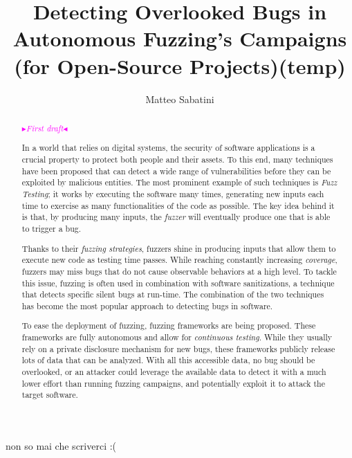 \documentclass[binding=0.6cm, oneside]{sapthesis}%
\title{Detecting Overlooked Bugs in Autonomous Fuzzing's Campaigns (for Open-Source Projects)(temp)}
\author{Matteo Sabatini}
\newcommand{\mytext}[2]{\textcolor{#1}{#2}}
\newcommand{\mynote}[2]{\xspace\fbox{\bfseries\sffamily\scriptsize{#1}}
	{\small$\blacktriangleright$\textsf{\scriptsize\emph{#2}}$\blacktriangleleft$}}
\newcommand{\matteo}[1]{\mytext{magenta}{\mynote{MM}{#1}}}
\begin{document}
\frontmatter
\maketitle

\begin{acknowledgments}
non so mai che scriverci :(
\end{acknowledgments}


\begin{abstract}

	\matteo{First draft}

	In a world that relies on digital systems, the security of software applications is a crucial property to protect both people and their assets. To this end, many techniques have been proposed that can detect a wide range of vulnerabilities before they can be exploited by malicious entities. The most prominent example of such techniques is \textit{Fuzz Testing}; it works by executing the software many times, generating new inputs each time to exercise as many functionalities of the code as possible. The key idea behind it is that, by producing many inputs, the \textit{fuzzer} will eventually produce one that is able to trigger a bug.

	Thanks to their \textit{fuzzing strategies}, fuzzers shine in producing inputs that allow them to execute new code as testing time passes. While reaching constantly increasing \textit{coverage}, fuzzers may miss bugs that do not cause observable behaviors at a high level. To tackle this issue, fuzzing is often used in combination with software sanitizations, a technique that detects specific silent bugs at run-time. The combination of the two techniques has become the most popular approach to detecting bugs in software.
   
	To ease the deployment of fuzzing, fuzzing frameworks are being proposed. These frameworks are fully autonomous and allow for \textit{continuous testing}. While they usually rely on a private disclosure mechanism for new bugs, these frameworks publicly release lots of data that can be analyzed. With all this accessible data, no bug should be overlooked, or an attacker could leverage the available data to detect it with a much lower effort than running fuzzing campaigns, and potentially exploit it to attack the target software.
	   

\end{abstract}
\end{document}
